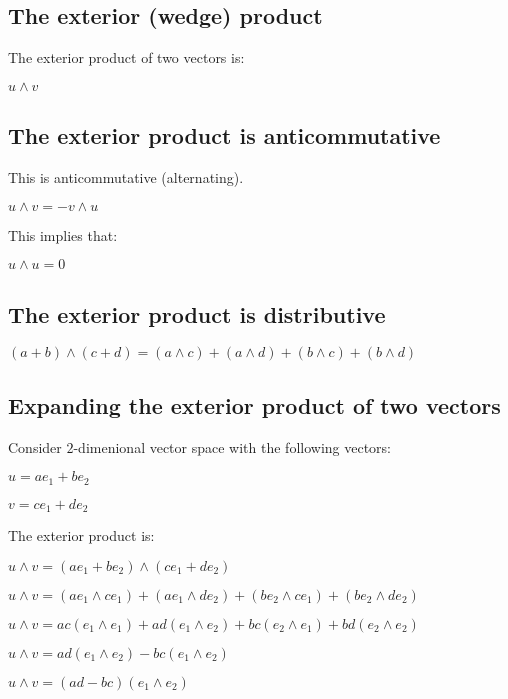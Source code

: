 
\subsection{The exterior (wedge) product}

The exterior product of two vectors is:

\(u\land v\)

\subsection{The exterior product is anticommutative}

This is anticommutative (alternating).

\(u\land v=-v\land u\)

This implies that:

\(u\land u=0\)

\subsection{The exterior product is distributive}

\((a+b)\land (c+d)=(a\land c)+(a\land d)+(b\land c)+(b\land d)\)

\subsection{Expanding the exterior product of two vectors}

Consider \(2\)-dimenional vector space with the following vectors:

\(u=ae_1+be_2\)

\(v=ce_1+de_2\)

The exterior product is:

\(u\land v=(ae_1+be_2)\land (ce_1+de_2)\)

\(u\land v=(ae_1\land ce_1)+(ae_1\land de_2)+(be_2\land ce_1)+(be_2\land de_2)\)

\(u\land v=ac(e_1\land e_1)+ad(e_1\land e_2)+bc(e_2\land e_1)+bd(e_2\land e_2)\)

\(u\land v=ad(e_1\land e_2)-bc(e_1\land e_2)\)

\(u\land v=(ad-bc)(e_1\land e_2)\)

